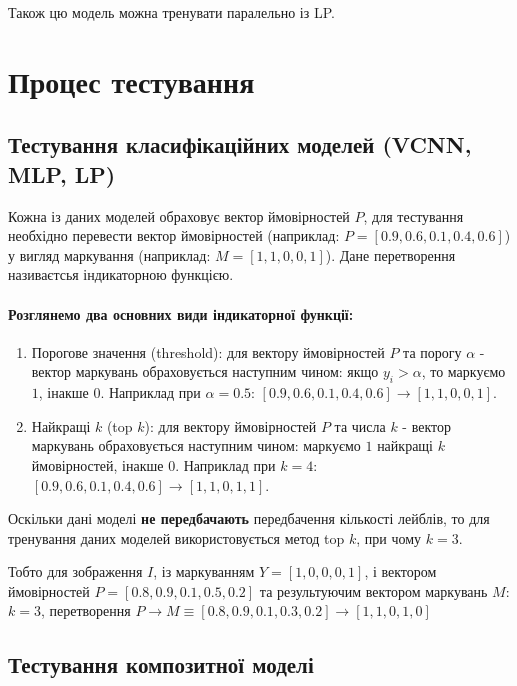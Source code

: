 \documentclass{udstu}
\begin{document}
Також цю модель можна тренувати паралельно із LP.


\section{Процес тестування}

\subsection{Тестування класифікаційних моделей (VCNN, MLP, LP)}

Кожна із даних моделей обраховує вектор ймовірностей $P$,
для тестування необхідно перевести вектор ймовірностей (наприклад: $P = [0.9, 0.6, 0.1, 0.4, 0.6]$)
у вигляд маркування (наприклад: $M = [1,1,0,0,1]$). Дане перетворення називаєтсья індикаторною функцією.

\paragraph{Розглянемо два основних види індикаторної функції:}

\begin{enumerate}[1)]
	\item Порогове значення (threshold):
	для вектору ймовірностей $P$ та порогу $\alpha$ - вектор маркувань обраховується наступним чином:
	якщо $y_i > \alpha$, то маркуємо $1$, інакше $0$.
	Наприклад при $\alpha = 0.5$: $[0.9, 0.6, 0.1, 0.4, 0.6] \to [1,1,0,0,1]$.

	\item Найкращі $k$ (top $k$):
	для вектору ймовірностей $P$ та числа $k$ - вектор маркувань обраховується наступним чином:
	маркуємо $1$ найкращі $k$ ймовірностей, інакше $0$.
	Наприклад при $k = 4$: $[0.9, 0.6, 0.1, 0.4, 0.6] \to [1,1,0,1,1]$.
\end{enumerate}

Оскільки дані моделі \textbf{не передбачають} передбачення кількості лейблів,
то для тренування даних моделей використовується метод top $k$, при чому
$k = 3$.

\label{dynk}

Тобто для зображення $I$,
із маркуванням $Y = [1,0,0,0,1]$,
і вектором ймовірностей $P = [0.8,0.9,0.1,0.5,0.2]$
та результуючим вектором маркувань $M$:
$k = 3$, перетворення $P \to M \equiv [0.8,0.9,0.1,0.3,0.2] \to [1,1,0,1,0]$


\subsection{Тестування композитної моделі}
\end{document}
